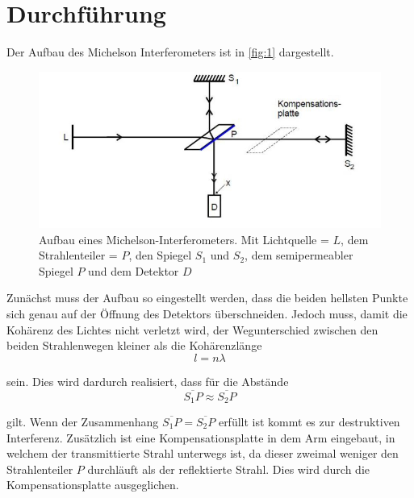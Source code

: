 \newpage
\section{Durchführung}
Der Aufbau des Michelson Interferometers ist in \autoref{fig:1} dargestellt. 

\begin{figure}
    \centering
    \includegraphics[scale = 0.7]{Picture/Pic1.JPG}
    \caption{Aufbau eines Michelson-Interferometers.
            Mit Lichtquelle = $L$, dem Strahlenteiler = $P$, den Spiegel $S_1$ und $S_2$, dem semipermeabler Spiegel $P$ und dem Detektor $D$ \cite{V401}}
    \label{fig:1}
  \end{figure}

\noindent
Zunächst muss der Aufbau so eingestellt werden, dass die beiden hellsten Punkte sich genau auf der 
Öffnung des Detektors überschneiden. Jedoch muss, damit die Kohärenz des Lichtes nicht verletzt wird, der Wegunterschied zwischen den beiden Strahlenwegen kleiner als die Kohärenzlänge 
\begin{equation*}
    l = n \lambda
  \end{equation*}

\noindent
sein. Dies wird dardurch realisiert, dass für die Abstände 
\begin{equation*}
    \overline{S_1 P} \approx \overline{S_2 P}
    \label{eqn:close}
\end{equation*}

\noindent
gilt. Wenn der Zusammenhang $\overline{S_1 P} = \overline{S_2 P}$ erfüllt ist kommt es zur destruktiven Interferenz. Zusätzlich ist eine Kompensationsplatte in dem Arm eingebaut, 
in welchem der transmittierte Strahl unterwegs ist, da dieser zweimal weniger den Strahlenteiler $P$ durchläuft als der reflektierte Strahl. Dies wird durch die Kompensationsplatte ausgeglichen.

